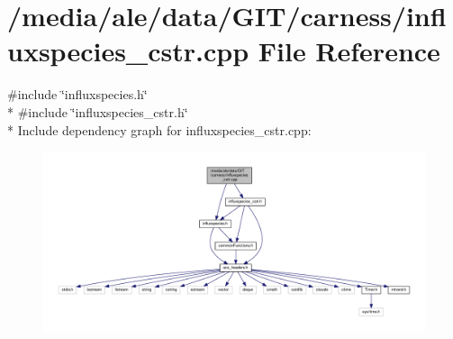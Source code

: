 \hypertarget{a00035}{\section{/media/ale/data/\-G\-I\-T/carness/influxspecies\-\_\-cstr.cpp File Reference}
\label{a00035}
}
{\ttfamily \#include \char`\"{}influxspecies.\-h\char`\"{}}\\*
{\ttfamily \#include \char`\"{}influxspecies\-\_\-cstr.\-h\char`\"{}}\\*
Include dependency graph for influxspecies\-\_\-cstr.\-cpp\-:\nopagebreak
\begin{figure}[H]
\begin{center}
\leavevmode
\includegraphics[width=350pt]{a00067}
\end{center}
\end{figure}
